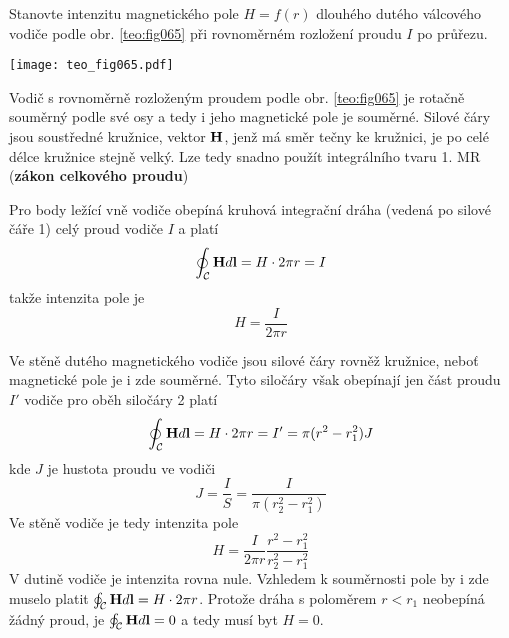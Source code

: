 \begin{mdframed}[style=mdexam]
  \begin{example}
    Stanovte intenzitu magnetického pole $H=f(r)$ dlouhého dutého válcového vodiče podle obr.
    \ref{teo:fig065} při rovnoměrném rozložení proudu $I$ po průřezu. 
    
    {\centering
      \captionsetup{type=figure}
      \texttt{[image: teo\_fig065.pdf]}
      \label{teo:fig065}
    \par}
    
    Vodič s rovnoměrně rozloženým proudem podle obr. \ref{teo:fig065} je rotačně souměrný podle své
    osy a tedy i jeho magnetické pole je souměrné. Silové čáry jsou soustředné kružnice, vektor
    $\mathbf{H}$, jenž má směr tečny ke kružnici, je po celé délce kružnice stejně velký. Lze tedy
    snadno použít integrálního tvaru 1. MR (\textbf{zákon celkového proudu})
    
    Pro body ležící vně vodiče obepíná kruhová integrační dráha (vedená po silové čáře 1) celý
    proud vodiče $I$ a platí
    \begin{equation}\label{TEMP:eq_1MR_duty_valec}
      \oint_{\mathcal{C}}\mathbf{H}d\mathbf{l} = H\cdot 2\pi r = I
    \end{equation}
    takže intenzita pole je
    \begin{equation}\label{TEMP:eq_H_duty_valec}
      H = \frac{I}{2\pi r}
    \end{equation}
    
    Ve stěně dutého magnetického vodiče jsou silové čáry rovněž kružnice, neboť magnetické pole
    je i zde souměrné. Tyto siločáry však obepínají jen část proudu $I'$ vodiče pro oběh siločáry
    2 platí
    \begin{equation}\label{TEMP:eq_1MR_uvnitr_valce}
      \oint_{\mathcal{C}}\mathbf{H}d\mathbf{l} = H\cdot 2\pi r = I' = \pi(r^2-r_1^2)J
    \end{equation}
    kde $J$ je hustota proudu ve vodiči
    \begin{equation}\label{TEMP:eq_J_duty_valec}
      J = \frac{I}{S}= \frac{I}{\pi(r_2^2-r_1^2)}
    \end{equation}
    Ve stěně vodiče je tedy intenzita pole
    \begin{equation}\label{TEMP:eq_H_uvnitr_valce}
      H = \frac{I}{2\pi r}\frac{r^2-r_1^2}{r_2^2-r_1^2}
    \end{equation}
    V dutině vodiče je intenzita rovna nule. Vzhledem k souměrnosti pole by i zde muselo platit
    $\oint_{\mathcal{C}}\mathbf{H}d\mathbf{l} = H\cdot 2\pi r$. Protože dráha s poloměrem $r<r_1$ neobepíná
    žádný proud, je $\oint_{\mathcal{C}}\mathbf{H}d\mathbf{l} = 0$ a tedy musí byt $H = 0$.
  \end{example}    
\end{mdframed}